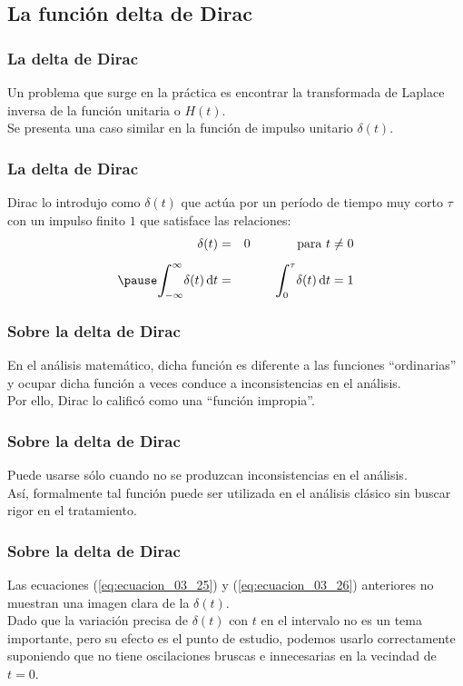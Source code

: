 \documentclass[12pt]{beamer}
\begin{document}
\subsection{La función delta de Dirac}

\begin{frame}
\frametitle{La delta de Dirac}
Un problema que surge en la práctica es encontrar la transformada de Laplace inversa de la función unitaria o $H(t)$.
\\
\bigskip
\pause
Se presenta una caso similar en la función de impulso unitario $\delta (t)$.
\end{frame}
\begin{frame}
\frametitle{La delta de Dirac}
Dirac lo introdujo como $\delta (t)$ que actúa por un período de tiempo muy corto $\tau$ con un impulso finito $1$ que satisface las relaciones:
\pause
\begin{eqnarray}
\delta (t) &=& 0 \hspace{1.3cm} \mbox{para  } t \neq 0 \label{eq:ecuacion_03_25} \\[0.5em] \pause
\scaleint{6ex}_{\bs - \infty}^{\infty} \delta (t) \dd{t} &=& \scaleint{6ex}_{\bs 0}^{\tau} \delta (t) \dd{t} = 1 \label{eq:ecuacion_03_26}
\end{eqnarray}
\end{frame}
\begin{frame}
\frametitle{Sobre la delta de Dirac}
En el análisis matemático, dicha función es diferente a las funciones \enquote{ordinarias} y ocupar dicha función a veces conduce a inconsistencias en el análisis.
\\
\bigskip
\pause
Por ello, Dirac lo calificó como una \enquote{función impropia}.
\end{frame}
\begin{frame}
\frametitle{Sobre la delta de Dirac}
Puede usarse sólo cuando no se produzcan inconsistencias en el análisis.
\\
\bigskip
\pause
Así, formalmente tal función puede ser utilizada en el análisis clásico sin buscar rigor en el tratamiento.
\end{frame}
\begin{frame}
\frametitle{Sobre la delta de Dirac}
Las ecuaciones (\ref{eq:ecuacion_03_25}) y (\ref{eq:ecuacion_03_26}) anteriores no muestran una imagen clara de la $\delta (t)$.
\\
\bigskip
\pause
Dado que la variación precisa de $\delta (t)$ con $t$ en el intervalo no es un tema importante, pero su efecto es el punto de estudio, podemos usarlo correctamente suponiendo que no tiene oscilaciones bruscas e innecesarias en la vecindad de $t = 0$.
\end{frame}
\end{document}
